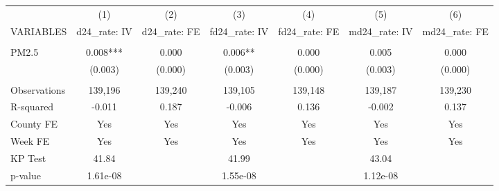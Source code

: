 \begin{tabular}{lcccccc} \hline
 & (1) & (2) & (3) & (4) & (5) & (6) \\
VARIABLES & d24\_rate: IV & d24\_rate: FE & fd24\_rate: IV & fd24\_rate: FE & md24\_rate: IV & md24\_rate: FE \\ \hline
 &  &  &  &  &  &  \\
PM2.5 & 0.008*** & 0.000 & 0.006** & 0.000 & 0.005 & 0.000 \\
 & (0.003) & (0.000) & (0.003) & (0.000) & (0.003) & (0.000) \\
 &  &  &  &  &  &  \\
Observations & 139,196 & 139,240 & 139,105 & 139,148 & 139,187 & 139,230 \\
R-squared & -0.011 & 0.187 & -0.006 & 0.136 & -0.002 & 0.137 \\
County FE & Yes & Yes & Yes & Yes & Yes & Yes \\
Week FE & Yes & Yes & Yes & Yes & Yes & Yes \\
KP Test & 41.84 &  & 41.99 &  & 43.04 &  \\
 p-value & 1.61e-08 &  & 1.55e-08 &  & 1.12e-08 &  \\ \hline
\end{tabular}
